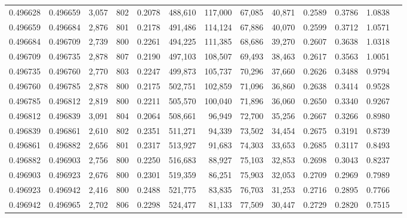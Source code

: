 \begin{tabular}{rrrrrrrrrrrrr}
0.496628 & 0.496659 &  3,057 & 802 &                                     0.2078 & 488,610 & 117,000 &  67,085 &  40,871 & 0.2589 & 0.3786 & 1.0838 \\
0.496659 & 0.496684 &  2,876 & 801 &                                     0.2178 & 491,486 & 114,124 &  67,886 &  40,070 & 0.2599 & 0.3712 & 1.0571 \\
0.496684 & 0.496709 &  2,739 & 800 &                                     0.2261 & 494,225 & 111,385 &  68,686 &  39,270 & 0.2607 & 0.3638 & 1.0318 \\
0.496709 & 0.496735 &  2,878 & 807 &                                     0.2190 & 497,103 & 108,507 &  69,493 &  38,463 & 0.2617 & 0.3563 & 1.0051 \\
0.496735 & 0.496760 &  2,770 & 803 &                                     0.2247 & 499,873 & 105,737 &  70,296 &  37,660 & 0.2626 & 0.3488 & 0.9794 \\
0.496760 & 0.496785 &  2,878 & 800 &                                     0.2175 & 502,751 & 102,859 &  71,096 &  36,860 & 0.2638 & 0.3414 & 0.9528 \\
0.496785 & 0.496812 &  2,819 & 800 &                                     0.2211 & 505,570 & 100,040 &  71,896 &  36,060 & 0.2650 & 0.3340 & 0.9267 \\
0.496812 & 0.496839 &  3,091 & 804 &                                     0.2064 & 508,661 &  96,949 &  72,700 &  35,256 & 0.2667 & 0.3266 & 0.8980 \\
0.496839 & 0.496861 &  2,610 & 802 &                                     0.2351 & 511,271 &  94,339 &  73,502 &  34,454 & 0.2675 & 0.3191 & 0.8739 \\
0.496861 & 0.496882 &  2,656 & 801 &                                     0.2317 & 513,927 &  91,683 &  74,303 &  33,653 & 0.2685 & 0.3117 & 0.8493 \\
0.496882 & 0.496903 &  2,756 & 800 &                                     0.2250 & 516,683 &  88,927 &  75,103 &  32,853 & 0.2698 & 0.3043 & 0.8237 \\
0.496903 & 0.496923 &  2,676 & 800 &                                     0.2301 & 519,359 &  86,251 &  75,903 &  32,053 & 0.2709 & 0.2969 & 0.7989 \\
0.496923 & 0.496942 &  2,416 & 800 &                                     0.2488 & 521,775 &  83,835 &  76,703 &  31,253 & 0.2716 & 0.2895 & 0.7766 \\
0.496942 & 0.496965 &  2,702 & 806 &                                     0.2298 & 524,477 &  81,133 &  77,509 &  30,447 & 0.2729 & 0.2820 & 0.7515 \\

\end{tabular}
